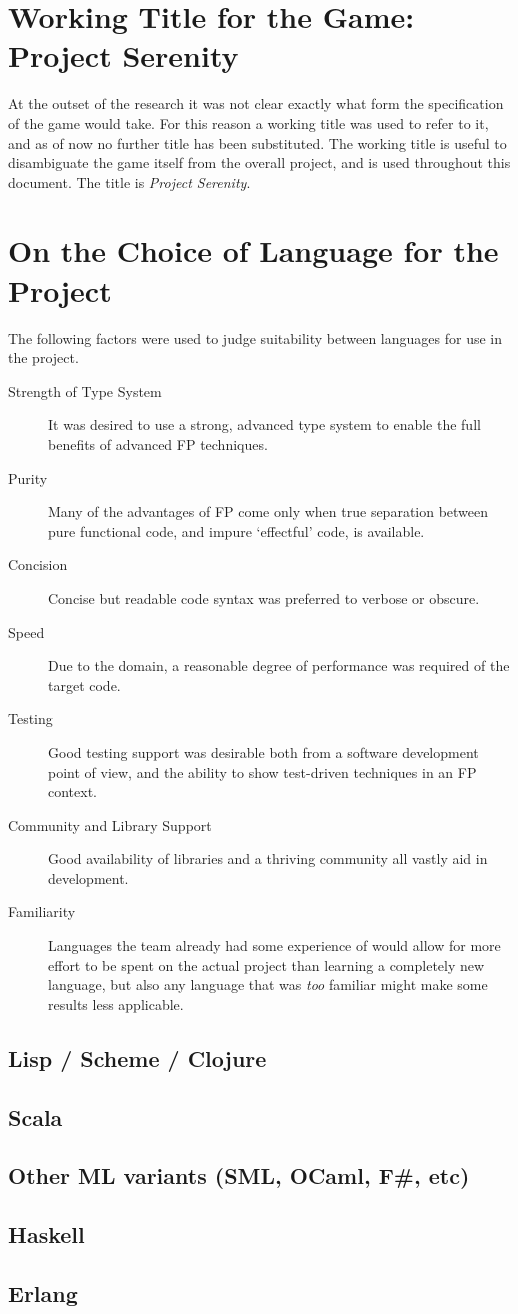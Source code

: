 \section{Working Title for the Game: Project Serenity}

At the outset of the research it was not clear exactly what form the specification of the game would take. For this reason a working title was used to refer to it, and as of now no further title has been substituted. The working title is useful to disambiguate the game itself from the overall project, and is used throughout this document. The title is \emph{Project Serenity}.

\section{On the Choice of Language for the Project}

The following factors were used to judge suitability between languages for use in the project.

\begin{description}
	\item[Strength of Type System] It was desired to use a strong, advanced type system to enable the full benefits of advanced FP techniques.
	\item[Purity] Many of the advantages of FP come only when true separation between pure functional code, and impure `effectful' code, is available.\cite{hudak1989conception}
	\item[Concision] Concise but readable code syntax was preferred to verbose or obscure.
	\item[Speed] Due to the domain, a reasonable degree of performance was required of the target code.
	\item[Testing] Good testing support was desirable both from a software development point of view, and the ability to show test-driven techniques in an FP context.
	\item[Community and Library Support] Good availability of libraries and a thriving community all vastly aid in development.
	\item[Familiarity] Languages the team already had some experience of would allow for more effort to be spent on the actual project than learning a completely new language, but also any language that was \emph{too} familiar might make some results less applicable.
\end{description}

\subsection{Lisp / Scheme / Clojure}
\subsection{Scala}
\subsection{Other ML variants (SML, OCaml, F\#, etc)}
\subsection{Haskell}
\subsection{Erlang}